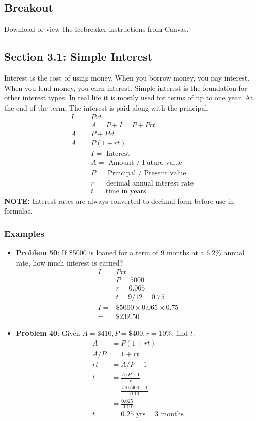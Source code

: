 \documentclass[14pt]{extarticle}
\begin{document}
\subsection{Breakout}
Download or view the Icebreaker instructions from Canvas.

\subsection{Section 3.1: Simple Interest}
Interest is the cost of using money. When you borrow money, you pay interest. When you lend money, you earn interest. Simple interest is the foundation for other interest types. In real life it is mostly used for terms of up to one year. At the end of the term, The interest is paid along with the principal.
\begin{align*}
	I = &Prt \tag{1} \\
	&A = P+I= P+ Prt \\
	A = &P + Prt \tag{2} \\
	A = &P(1+rt) \tag{3} \\
	&I = \text{ Interest} \\
	&A = \text{ Amount / Future value} \\
	&P = \text{ Principal / Present value} \\
	&r = \text{ decimal annual interest rate} \\
	&t = \text{ time in years}	
\end{align*}
\textbf{NOTE:} Interest rates are always converted to decimal form before use in formulas.
\subsubsection*{Examples}
\begin{itemize}
	\item \textbf{Problem 50}: If \$5000 is loaned for a term of 9 months at a 6.2\% annual rate, how much interest is earned?
	\begin{align*}
		I= &Prt \\
		&P = 5000 \\
		&r = 0.065 \\
		&t = 9/12 = 0.75 \\
		I =& \$5000 \times 0.065 \times 0.75 \\
		= &  \$232.50
	\end{align*}
	\item \textbf{Problem 40}: Given $A = \$410, P = \$400, r=10\%$, find $t$.
	\begin{align*}
		A &= P(1+rt) \\
		A/P &= 1+ rt \\
		rt & = A/P - 1 \\
		t &= \frac{A/P - 1}{r} \\
		&= \frac{410/400 - 1}{0.10} \\
		&= \frac{0.025}{0.10} \\
		t &= 0.25 \text{ yrs} = 3 \text{ months}
	\end{align*}
\end{itemize}
\end{document}
